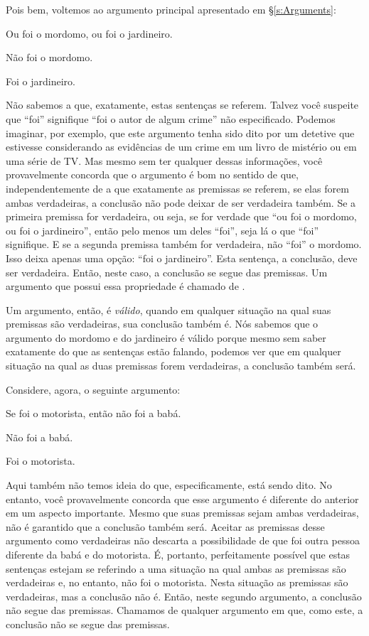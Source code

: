 Pois bem, voltemos ao argumento principal apresentado em \S\ref{s:Arguments}: 

	\begin{earg}
		\item[] Ou foi o mordomo, ou foi o jardineiro.
		\item[] Não foi o mordomo.
		\item[\therefore] Foi o jardineiro.
	\end{earg}
Não sabemos a que, exatamente, estas sentenças se referem.
Talvez você suspeite que ``foi'' signifique ``foi o autor de algum crime'' não especificado.
Podemos imaginar, por exemplo, que este argumento tenha sido dito por um detetive que estivesse considerando as evidências de um crime em um livro de mistério ou em uma série de TV.
Mas mesmo sem ter qualquer dessas informações, você provavelmente concorda que o argumento é bom no sentido de que, independentemente de a que exatamente as premissas se referem, se elas forem ambas verdadeiras, a conclusão não pode deixar de ser verdadeira também.
Se a primeira premissa for verdadeira, ou seja, se for verdade que ``ou foi o mordomo, ou foi o jardineiro'', então pelo menos um deles ``foi'', seja lá o que ``foi'' signifique.
E se a segunda premissa também for verdadeira, não ``foi'' o mordomo.
Isso deixa apenas uma opção: ``foi o jardineiro''. Esta sentença, a conclusão, deve ser verdadeira.
Então, neste caso, a conclusão se segue das premissas.
Um argumento que possui essa propriedade é chamado de .

Um argumento, então, é \emph{válido}, quando em qualquer situação na qual suas premissas são verdadeiras, sua conclusão também é.
Nós sabemos que o argumento do mordomo e do jardineiro é válido porque mesmo sem saber exatamente do que as sentenças estão falando, podemos ver que em qualquer situação na qual as duas premissas forem verdadeiras, a conclusão também será.

Considere, agora, o seguinte argumento:
\begin{earg}\label{argMaidDriver}
	\item[] Se foi o motorista, então não foi a babá.
	\item[] Não foi a babá.
	\item[\therefore] Foi o motorista.
\end{earg}
Aqui também não temos ideia do que, especificamente, está sendo dito.
No entanto, você provavelmente concorda que esse argumento é diferente do anterior em um aspecto importante.
Mesmo que suas premissas sejam ambas verdadeiras, não é garantido que a conclusão também será.
Aceitar as premissas desse argumento como verdadeiras não descarta a possibilidade de que foi outra pessoa diferente da babá e do motorista.
É, portanto, perfeitamente possível que estas sentenças estejam se referindo a uma situação na qual  ambas as premissas são verdadeiras e, no entanto, não foi o motorista.
Nesta situação as premissas são verdadeiras, mas a conclusão não é.
Então, neste segundo argumento, a conclusão não segue das premissas.
Chamamos de  qualquer argumento em que, como este, a conclusão não se segue das premissas.

